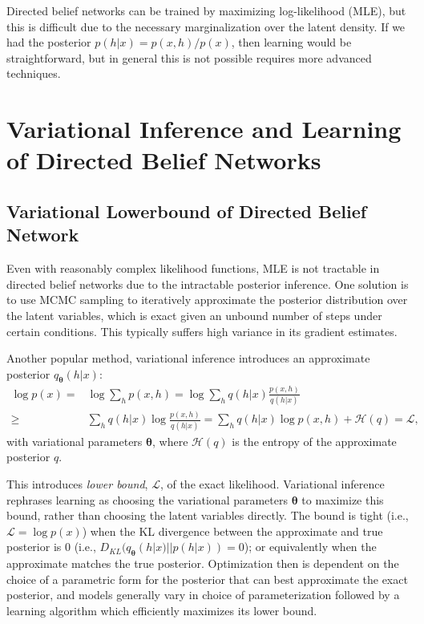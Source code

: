 \documentclass{article} %
\newcommand{\vects}[1]{\boldsymbol{#1}}
\newcommand{\TT}[0]{\vects{\theta}}
\newcommand{\LL}[0]{\mathcal{L}}
\newcommand{\HH}[0]{\mathcal{H}}
\begin{document}
Directed belief networks can be trained by maximizing log-likelihood (MLE), but
this is difficult due to the necessary marginalization over the latent density.
If we had the posterior $p(h|x) = p(x, h) / p(x)$, then learning would be straightforward,
but in general this is not possible requires more advanced
techniques. 

\section{Variational Inference and Learning of Directed Belief Networks}
\subsection{Variational Lowerbound of Directed Belief Network}

Even with reasonably complex likelihood functions, MLE is not tractable in
directed belief networks due to the intractable posterior inference.  One
solution is to use MCMC sampling to iteratively
approximate the posterior distribution over the latent variables, which is exact
given an unbound number of steps under certain conditions. This typically suffers high variance in its gradient estimates.

Another popular method, variational inference introduces an approximate
posterior $q_{\TT}(h|x)$:
\begin{align}
    \label{eq:approx_logp}
    \log p(x) =& \log \sum_{h} p(x, h) 
    = \log \sum_h q(h|x) \frac{p(x, h)}{q(h|x)} \nonumber \\
    \geq& \sum_h q(h|x) \log \frac{p(x, h)}{q(h|x)} 
    = \sum_h q(h|x) \log p(x,h) + \HH(q) = \LL,
\end{align}
with variational parameters $\TT$, where $\HH(q)$ is the entropy of the
approximate posterior $q$. 

This introduces \emph{lower bound}, $\LL$, of the exact likelihood. Variational
inference rephrases learning as choosing the variational parameters $\TT$ to
maximize this bound, rather than choosing the latent variables directly. The
bound is tight (i.e., $\LL = \log p(x)$) when the KL divergence between the
approximate and true posterior is $0$ (i.e., $D_{KL}(q_{\TT}(h|x)||p(h|x)) =
0$); or equivalently when the approximate matches the true posterior.
Optimization then is dependent on the choice of a parametric form for the
posterior that can best approximate the exact posterior, and models generally
vary in choice of parameterization followed by a learning algorithm which
efficiently maximizes its lower bound.
\end{document}
